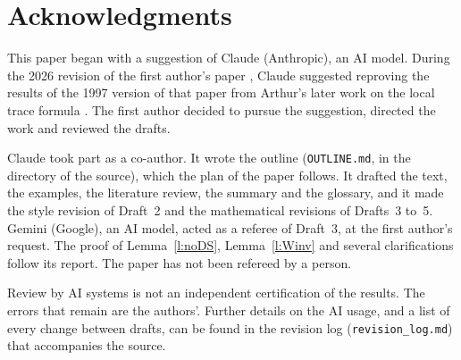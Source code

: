 \documentclass[12pt,letterpaper]{article}
\numberwithin{equation}{section}
\theoremstyle{plain}
\theoremstyle{definition}
\theoremstyle{remark}
\begin{document}
\section*{Acknowledgments}
This paper began with a suggestion of Claude (Anthropic), an AI model. During the 2026 revision of the first author's paper \cite{Jo92}, Claude suggested reproving the results of the 1997 version of that paper from Arthur's later work on the local trace formula \cite{Ar91,Ar93}. The first author decided to pursue the suggestion, directed the work and reviewed the drafts.

Claude took part as a co-author. It wrote the outline (\texttt{OUTLINE.md}, in the directory of the source), which the plan of the paper follows. It drafted the text, the examples, the literature review, the summary and the glossary, and it made the style revision of Draft~2 and the mathematical revisions of Drafts~3 to~5. Gemini (Google), an AI model, acted as a referee of Draft~3, at the first author's request. The proof of Lemma~\ref{l:noDS}, Lemma~\ref{l:Winv} and several clarifications follow its report. The paper has not been refereed by a person.

Review by AI systems is not an independent certification of the results. The errors that remain are the authors'. Further details on the AI usage, and a list of every change between drafts, can be found in the revision log (\texttt{revision\_log.md}) that accompanies the source.
\end{document}
